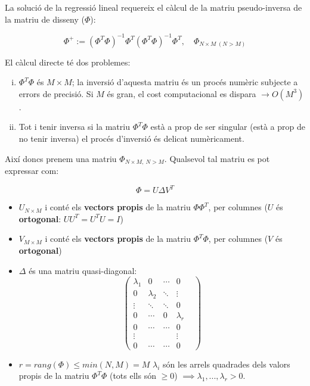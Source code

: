 \documentclass[a4paper]{article}
\begin{document}
La solució de la regressió lineal requereix el càlcul de la matriu pseudo-inversa de la matriu de disseny ($\Phi$):

$$ \Phi^+ := \left( \Phi^T \Phi \right)^{-1} \Phi^T\left( \Phi^T \Phi \right)^{-1} \Phi^T,\quad \Phi_{N \times M \ (N > M)} $$

El càlcul directe té dos problemes:
\begin{enumerate}[i)]
	\item $\Phi^T \Phi$ és $M \times M$; la inversió d'aquesta matriu és un procés numèric subjecte a errors de precisió. Si $M$ és gran, el cost computacional es dispara $\rightarrow O(M^3)$.
	\item Tot i tenir inversa si la matriu $\Phi^T \Phi$ està a prop de ser singular (està a prop de no tenir inversa) el procés d'inversió és delicat numèricament.
\end{enumerate}

Així doncs prenem una matriu $\Phi_{N \times M, \ N > M}$. Qualsevol tal matriu es pot expressar com:

$$
\Phi = U \Delta V^T
$$

\begin{itemize}
	\item $U_{N \times M}$ i conté els \textbf{vectors propis} de la matriu $\Phi \Phi^T$, per columnes ($U$ és \textbf{ortogonal}: $U U^T = U^T U = I$)
	\item $V_{M \times M}$ i conté els \textbf{vectors propis} de la matriu $\Phi^T \Phi$, per columnes ($V$ és \textbf{ortogonal})
	\item $\Delta$ és una matriu quasi-diagonal:
	$$
	\begin{pmatrix}
	\lambda_1 & 0 & \cdots &  0 \\
	0 & \lambda_2 & \ddots &  \vdots \\
	\vdots & \ddots & \ddots & 0 & \\
	0 & \cdots & 0 &\lambda_r \\
	0 & \cdots & \cdots & 0 \\
	\vdots & & & \vdots \\
	0 & \cdots & \cdots & 0
	\end{pmatrix}
	$$
	
	\item  $r = rang(\Phi) \le min(N,M) = M$ $\lambda_i$ són les arrels quadrades dels valors propis de la matriu $\Phi^T \Phi$ (tots ells són $\ge 0$) $\implies \lambda_1, ...,\lambda_r > 0$.
\end{itemize}
\end{document}
